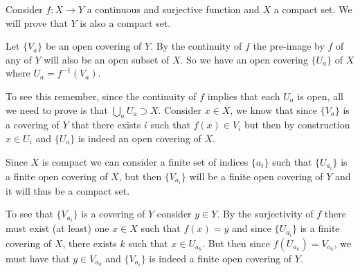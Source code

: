 \documentclass[12pt]{article}
\begin{document}
Consider $f: X \to Y$ a continuous and surjective function and $X$ a compact set. We will prove that $Y$ is also a compact set.

Let $\{V_a\}$ be an open covering of $Y$. By the continuity of $f$ the pre-image by $f$ of any  of $Y$ will also be an open subset of $X$.
So we have an open covering $\{U_a\}$ of $X$ where $U_a = f^{-1}(V_a)$.

To see this remember, since the continuity of $f$ implies that each $U_a$ is open, all we need to prove is that $\bigcup_a U_a \supset X$.
Consider $x \in X$, we know that since $\{V_a\}$ is a covering of $Y$ that there exists $i$ such that $f(x) \in V_i$ but then by construction $x \in U_i$ and $\{U_a\}$ is indeed an open covering of $X$.

Since $X$ is compact we can consider a finite set of indices $\{a_i\}$ such that $\{U_{a_i}\}$ is a finite open covering of $X$, but then $\{V_{a_i}\}$ will be a finite open covering of $Y$ and it will thus be a compact set.

To see that $\{V_{a_i}\}$ is a covering of $Y$ consider $y \in Y$. By the surjectivity of $f$ there must exist (at least) one $x \in X$ such that $f(x) = y$ and since $\{U_{a_i}\}$ is a finite covering of $X$, there exists $k$ such that $x \in U_{a_k}$.
But then since $f(U_{a_k}) = V_{a_k}$, we must have that $y \in V_{a_k}$ and  $\{V_{a_i}\}$ is indeed a finite open covering of $Y$.
\end{document}
